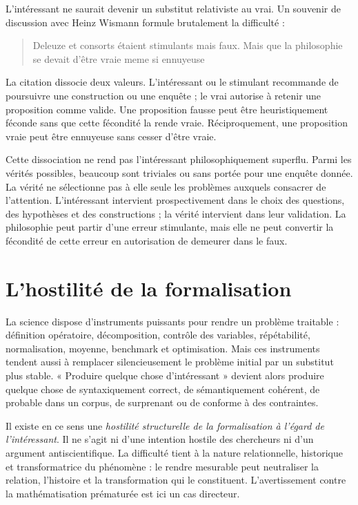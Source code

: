 \documentclass[11pt,a4paper]{article}
\begin{document}
L'intéressant ne saurait devenir un substitut relativiste au vrai. Un souvenir
de discussion avec Heinz Wismann formule brutalement la difficulté :

\begin{quote}
Deleuze et consorts étaient stimulants mais faux. Mais que la philosophie se
devait d'être vraie meme si ennuyeuse
\end{quote}

La citation dissocie deux valeurs. L'intéressant ou le stimulant recommande de
poursuivre une construction ou une enquête ; le vrai autorise à retenir une
proposition comme valide. Une proposition fausse peut être heuristiquement
féconde sans que cette fécondité la rende vraie. Réciproquement, une proposition
vraie peut être ennuyeuse sans cesser d'être vraie.

Cette dissociation ne rend pas l'intéressant philosophiquement superflu. Parmi
les vérités possibles, beaucoup sont triviales ou sans portée pour une enquête
donnée. La vérité ne sélectionne pas à elle seule les problèmes auxquels
consacrer de l'attention. L'intéressant intervient prospectivement dans le choix
des questions, des hypothèses et des constructions ; la vérité intervient dans
leur validation. La philosophie peut partir d'une erreur stimulante, mais elle
ne peut convertir la fécondité de cette erreur en autorisation de demeurer dans
le faux.

\section{L'hostilité de la formalisation}

La science dispose d'instruments puissants pour rendre un problème traitable :
définition opératoire, décomposition, contrôle des variables, répétabilité,
normalisation, moyenne, benchmark et optimisation. Mais ces instruments tendent
aussi à remplacer silencieusement le problème initial par un substitut plus
stable. « Produire quelque chose d'intéressant » devient alors produire quelque
chose de syntaxiquement correct, de sémantiquement cohérent, de probable dans un
corpus, de surprenant ou de conforme à des contraintes.

Il existe en ce sens une \emph{hostilité structurelle de la formalisation à
l'égard de l'intéressant}. Il ne s'agit ni d'une intention hostile des
chercheurs ni d'un argument antiscientifique. La difficulté tient à la nature
relationnelle, historique et transformatrice du phénomène : le rendre mesurable
peut neutraliser la relation, l'histoire et la transformation qui le
constituent. L'avertissement contre la mathématisation prématurée
\parencite{russell1995rationality,russell1995awardlecture} est ici un cas
directeur.
\end{document}
